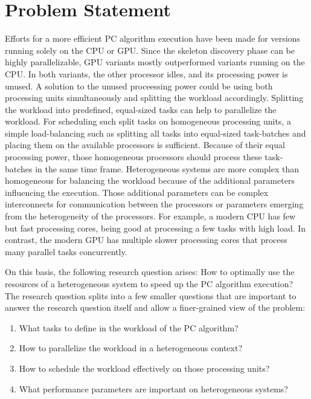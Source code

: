\chapter{Problem Statement}
\label{chap:problem_statement}
Efforts for a more efficient PC algorithm execution have been made for versions running solely on the CPU or GPU. Since the skeleton discovery phase can be highly parallelizable, GPU variants mostly outperformed variants running on the CPU. In both variants, the other processor idles, and its processing power is unused. A solution to the unused proceessing power could be using both processing units simultaneously and splitting the workload accordingly.
Splitting the workload into predefined, equal-sized tasks can help to parallelize the workload. For scheduling such split tasks on homogeneous processing units, a simple load-balancing such as splitting all tasks into equal-sized task-batches and placing them on the available processors is sufficient.
Because of their equal processing power, those homogeneous processors should process these task-batches in the same time frame.
Heterogeneous systems are more complex than homogeneous for balancing the workload because of the additional parameters influencing the execution. Those additional parameters can be complex interconnects for communication between the processors or parameters emerging from the heterogeneity of the processors. For example, a modern CPU has few but fast processing cores, being good at processing a few tasks with high load. In contrast, the modern GPU has multiple slower processing cores that process many parallel tasks concurrently.

On this basis, the following research question arises: How to optimally use the resources of a heterogeneous system to speed up the PC algorithm execution?
The research question splits into a few smaller questions that are important to answer the research question itself and allow a finer-grained view of the problem:

\begin{enumerate}
  \item What tasks to define in the workload of the PC algorithm?
  \item How to parallelize the workload in a heterogeneous context?
  \item How to schedule the workload effectively on those processing units?
  \item What performance parameters are important on heterogeneous systems?
\end{enumerate}

